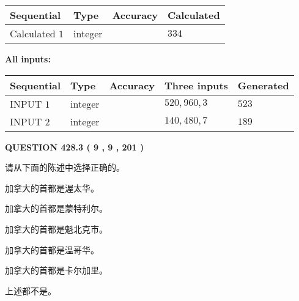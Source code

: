 \documentclass{ctexart}
\begin{document}
   
   
   
\noindent{}
   
   
  
  
\noindent\begin{tabular}{|l|l|l|l|}
\hline
 Sequential & Type & Accuracy & Calculated \\ 
\hline
 
 
  Calculated $  1 $ & integer &  & 
  $ 334 $ 
 \\  \hline  
 \end{tabular}
   
   
   
   
\noindent\vspace{0.1in}\hspace{-0.08in} {\textbf{\Large{All inputs: }}}
   
   
  
  
\noindent\begin{tabular}{|l|l|l|l|l|}
\hline
 Sequential & Type & Accuracy & Three inputs & Generated \\ 
\hline
 
 
  INPUT $  1 $ & integer &  & $
 520
 , 
 960
 , 
 3
 $ & $ 523 $ 
 \\  \hline  
 
 
  INPUT $  2 $ & integer &  & $
 140
 , 
 480
 , 
 7
 $ & $ 189 $ 
 \\  \hline  
 \end{tabular}
   
   
  
\vspace{0.2in}
  
{\textbf{\Large{QUESTION
428.3 
 ( 9 , 9 , 201 )
}}}
  
  
请从下面的陈述中选择正确的。
 
 
加拿大的首都是渥太华。
 
 
加拿大的首都是蒙特利尔。
 
 
加拿大的首都是魁北克市。
 
 
加拿大的首都是温哥华。
 
 
加拿大的首都是卡尔加里。
 
 
 上述都不是。
 
 
\noindent{}
 
\end{document}
